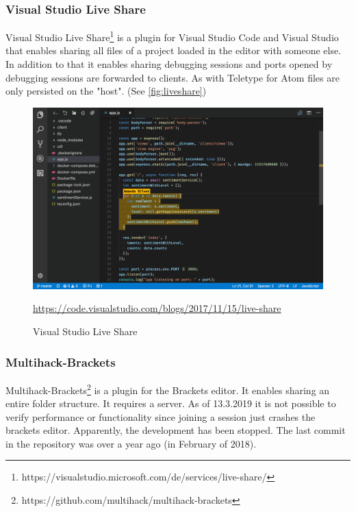 \subsubsection{Visual Studio Live Share}
Visual Studio Live Share\footnote{https://visualstudio.microsoft.com/de/services/live-share/}  is a plugin for Visual Studio Code and Visual Studio that enables sharing all files of a project loaded in the editor with someone else. In addition to that it enables sharing debugging sessions and ports opened by debugging sessions are forwarded to clients. As with Teletype for Atom files are only persisted on the "host". (See \autoref{fig:liveshare})
\begin{figure}[hb]
    \centering
    \includegraphics[width=1\linewidth]{figures/screenshots/vscodeliveshare.png}
	\caption{Visual Studio Live Share}
	\href{https://code.visualstudio.com/blogs/2017/11/15/live-share}{https://code.visualstudio.com/blogs/2017/11/15/live-share}
    \label{fig:liveshare}
\end{figure}
\subsubsection{Multihack-Brackets}
Multihack-Brackets\footnote{https://github.com/multihack/multihack-brackets} is a plugin for the Brackets editor. It enables sharing an entire folder structure. It requires a server. As of 13.3.2019 it is not possible to verify performance or functionality since joining a session just crashes the brackets editor. Apparently, the development has been stopped. The last commit in the repository was over a year ago (in February of 2018).
